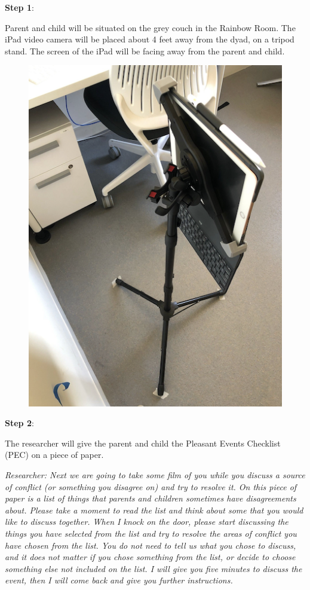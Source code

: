\documentclass[]{book}
\begin{document}
\textbf{Step 1}:

Parent and child will be situated on the grey couch in the Rainbow Room. The iPad video camera will be placed about 4 feet away from the dyad, on a tripod stand. The screen of the iPad will be facing away from the parent and child.

\begin{figure}
\centering
\includegraphics{images/parent:child_obser/2.png}
\caption{}
\end{figure}

\textbf{Step 2}:

The researcher will give the parent and child the Pleasant Events Checklist (PEC) on a piece of paper.

\emph{Researcher: Next we are going to take some film of you while you discuss a source of conflict (or something you disagree on) and try to resolve it. On this piece of paper is a list of things that parents and children sometimes have disagreements about. Please take a moment to read the list and think about some that you would like to discuss together. When I knock on the door, please start discussing the things you have selected from the list and try to resolve the areas of conflict you have chosen from the list. You do not need to tell us what you chose to discuss, and it does not matter if you chose something from the list, or decide to choose something else not included on the list. I will give you five minutes to discuss the event, then I will come back and give you further instructions.}
\end{document}
